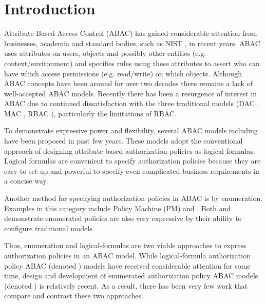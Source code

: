 \section{Introduction}
Attribute Based Access Control (ABAC) has gained considerable attention from businesses, academia and standard bodies, such as NIST \cite{nist-abac-draft}, in recent years. ABAC uses attributes on users, objects and possibly other entities (e.g. context/environment) and specifies rules using these attributes to assert who can have which access permissions (e.g. read/write) on which objects.  Although ABAC concepts have been around for over two decades there remains a lack of well-accepted ABAC models.  Recently there has been a resurgence of interest in ABAC due to continued dissatisfaction with the three traditional models (DAC \cite{dac}, MAC \cite{lbac}, RBAC \cite{rbac}), particularly the limitations of RBAC.

To demonstrate expressive power and flexibility, several ABAC models including  \cite{abacAlpha,hgabac,abac-ws,abac-for-web-service} have been proposed in past few years. These models adopt the conventional approach of designing attribute based authorization policies as logical formulas. Logical formulas are convenient to specify authorization policies  because they are easy to set up and powerful  to specify even complicated business requirements in a concise way. 
 

Another method for specifying authorization policies in ABAC is by enumeration. Examples in this category include Policy Machine (PM) \cite{policy-machine} and  \labac{} \cite{labac}. Both \PM{} and \labac{} demonstrate enumerated policies are also very expressive by their ability to configure traditional models. 

Thus, enumeration and logical-formulas are two viable approaches to express authorization policies in an ABAC model. While logical-formula authorization policy ABAC (denoted \LPModels{}) models have received considerable attention for some time, design and development of enumerated authorization policy ABAC models (denoted \EPModels) is relatively recent. As a result, there has been very few work that compare and contrast these two approaches. 


